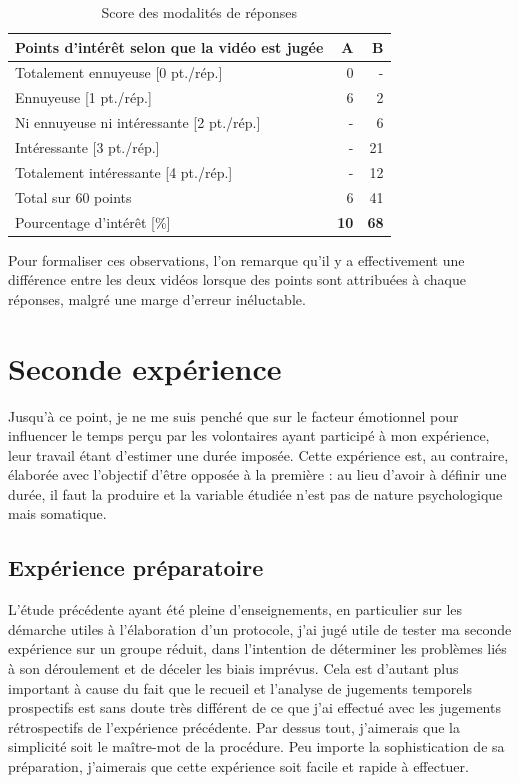 \documentclass[12pt,fleqn,oneside,french,openany]{book} %
\begin{document}
\begin{table}[h]
	\centering
	\caption{Score des modalités de réponses} \label{tbl:analyse1.2}
	\begin{tabular}{lrr}
		\toprule
		\textbf{Points d'intérêt selon que la vidéo est jugée} & \textbf{A} & \textbf{B} \\ \midrule
		Totalement ennuyeuse [0 pt./rép.] & 0 & - \\ 
		Ennuyeuse [1 pt./rép.] & 6 & 2 \\
		Ni ennuyeuse ni intéressante [2 pt./rép.] & - & 6 \\
		Intéressante [3 pt./rép.] & - & 21 \\ 
		Totalement intéressante [4 pt./rép.] & - & 12 \\ \cmidrule{2-3}
		Total sur 60 points & 6 & 41 \\ 
		Pourcentage d'intérêt [\%] & \textbf{10} & \textbf{68} \\ \bottomrule
	\end{tabular}
\end{table}

Pour formaliser ces observations, l'on remarque qu'il y a effectivement une différence entre les deux vidéos lorsque des points sont attribuées à chaque réponses, malgré une marge d'erreur inéluctable.

\newpage
\section{Seconde expérience} \label{sec:exp2.1}
Jusqu'à ce point, je ne me suis penché que sur le facteur émotionnel pour influencer le temps perçu par les volontaires ayant participé à mon expérience, leur travail étant d'estimer une durée imposée. Cette expérience est, au contraire, élaborée avec l'objectif d'être opposée à la première : au lieu d'avoir à définir une durée, il faut la produire et la variable étudiée n'est pas de nature psychologique mais somatique. 

\subsection{Expérience préparatoire} \label{ssec:but2.1}
L'étude précédente ayant été pleine d'enseignements, en particulier sur les démarche utiles à l'élaboration d'un protocole, j'ai jugé utile de tester ma seconde expérience sur un groupe réduit, dans l'intention de déterminer les problèmes liés à son déroulement et de déceler les biais imprévus. Cela est d'autant plus important à cause du fait que le recueil et l'analyse de jugements temporels prospectifs est sans doute très différent de ce que j'ai effectué avec les jugements rétrospectifs de l'expérience précédente. Par dessus tout, j'aimerais que la simplicité soit le maître-mot de la procédure. Peu importe la sophistication de sa préparation, j'aimerais que cette expérience soit facile et rapide à effectuer.
\end{document}
